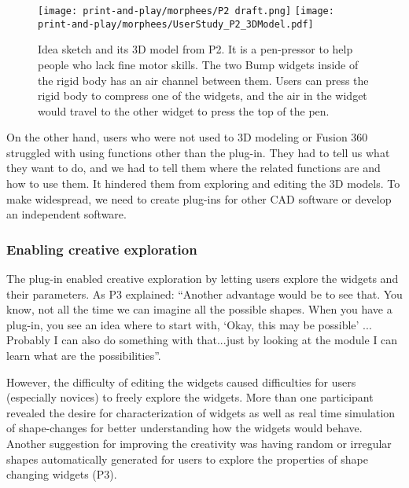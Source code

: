           \begin{figure}
            \centering 
            \texttt{[image: print-and-play/morphees/P2 draft.png]} 
            \texttt{[image: print-and-play/morphees/UserStudy\_P2\_3DModel.pdf]}
            \caption{Idea sketch and its 3D model from P2. It is a pen-pressor
              to help people who lack fine motor skills. The two Bump widgets
              inside of the rigid body has an air channel between them. Users can
              press the rigid body to compress one of the widgets, and the air in
              the widget would travel to the other widget to press the top of the
              pen.}
            \label{fig:p2}
          \end{figure}
          
          On the other hand, users who were not used to 3D modeling or Fusion
          360 struggled with using functions other than the \mp plug-in.  They
          had to tell us what they want to do, and we had to tell them where the
          related functions are and how to use them. It hindered them from
          exploring and editing the 3D models. To make \mp widespread, we need
          to create plug-ins for other CAD software or develop an independent
          software.
                  
        \subsubsection{Enabling creative exploration}
          The plug-in enabled creative exploration by  letting users explore the
          widgets and their parameters.  As P3 explained: ``Another advantage
          would be to see that. You know, not all the time we can imagine all
          the possible shapes. When you have a plug-in, you see an idea where to
          start with, `Okay, this may be possible' ... Probably I can also do
          something with that...just by looking at the module I can learn what
          are the possibilities''.
                  
          However, the difficulty of editing the widgets caused difficulties for
          users (especially novices) to freely explore the widgets. More than
          one participant revealed the desire for characterization of widgets as
          well as real time simulation of shape-changes for better understanding
          how the widgets would behave. Another suggestion for improving the
          creativity was having random or irregular shapes automatically
          generated for users to explore the properties of shape changing
          widgets (P3).
      
